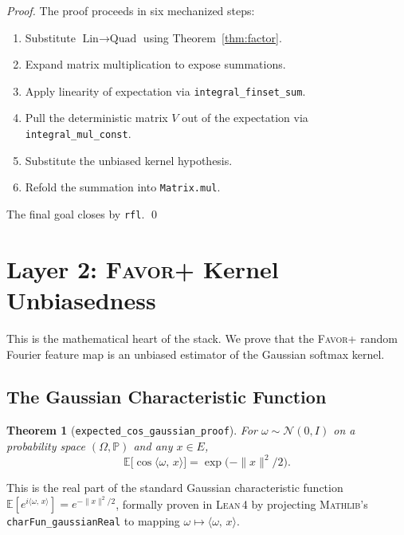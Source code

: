 \documentclass[11pt,a4paper,twocolumn]{article}
\newtheorem{theorem}{Theorem}[section]
\theoremstyle{definition}
\theoremstyle{remark}
\newcommand{\E}{\mathbb{E}}
\newcommand{\Prob}{\mathbb{P}}
\newcommand{\favor}{\textsc{Favor+}}
\newcommand{\lean}{\textsc{Lean\,4}}
\newcommand{\mathlib}{\textsc{Mathlib}}
\newcommand{\ip}[2]{\langle #1,\, #2 \rangle}
\newcommand{\leancode}[1]{\texttt{\color{leanblue}#1}}
\begin{document}
\begin{proof}
The proof proceeds in six mechanized steps:
\begin{enumerate}[nosep,label=\textbf{Step \Alph*:}]
  \item Substitute $\text{Lin} \to \text{Quad}$ using
        Theorem~\ref{thm:factor}.
  \item Expand matrix multiplication to expose summations.
  \item Apply linearity of expectation via
        \leancode{integral\_finset\_sum}.
  \item Pull the deterministic matrix $V$ out of the expectation via
        \leancode{integral\_mul\_const}.
  \item Substitute the unbiased kernel hypothesis.
  \item Refold the summation into \leancode{Matrix.mul}.
\end{enumerate}
The final goal closes by \texttt{rfl}. \qed
\end{proof}


\section{Layer 2: \favor{} Kernel Unbiasedness}
\label{sec:layer2}

This is the mathematical heart of the stack. We prove that the \favor{}
random Fourier feature map is an unbiased estimator of the Gaussian softmax
kernel.

\subsection{The Gaussian Characteristic Function}

\begin{theorem}[\leancode{expected\_cos\_gaussian\_proof}]
\label{thm:gaussian}
For $\omega \sim \mathcal{N}(0, I)$ on a probability space $(\Omega, \Prob)$
and any $x \in E$,
\begin{equation}
  \E\!\bigl[\cos\ip{\omega}{x}\bigr]
  = \exp\!\bigl(-\|x\|^2 / 2\bigr).
  \label{eq:charfun}
\end{equation}
\end{theorem}

This is the real part of the standard Gaussian characteristic function
$\E[e^{i\ip{\omega}{x}}] = e^{-\|x\|^2/2}$, formally proven in \lean{} by 
projecting \mathlib{}'s \leancode{charFun\_gaussianReal} to mapping $\omega \mapsto \ip{\omega}{x}$.
\end{document}
